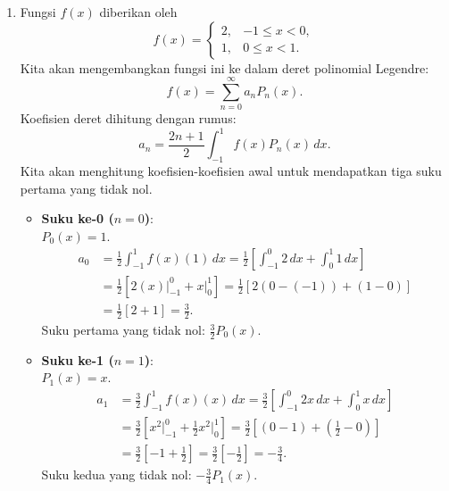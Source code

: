 \documentclass[12pt,openany,a4paper]{article}
\begin{document}
\begin{enumerate}
  \item Fungsi $f(x)$ diberikan oleh
        \[f(x) = \begin{cases} 2, & -1 \le x < 0, \\ 1, & 0 \le x < 1. \end{cases}\]
        Kita akan mengembangkan fungsi ini ke dalam deret polinomial Legendre:
        \[f(x) = \sum_{n=0}^{\infty} a_n P_n(x).\]
        Koefisien deret dihitung dengan rumus:
        \[a_n = \frac{2n + 1}{2} \int_{-1}^{1} f(x)P_n(x) \, dx.\]
        Kita akan menghitung koefisien-koefisien awal untuk mendapatkan tiga suku pertama yang tidak nol.
        \begin{itemize}
          \item \textbf{Suku ke-0 ($n=0$)}:\\
                $P_0(x) = 1$.
                \begin{align*}
                  a_0 & = \frac{1}{2} \int_{-1}^{1} f(x)(1) \, dx = \frac{1}{2} \left[ \int_{-1}^{0} 2 \, dx + \int_{0}^{1} 1 \, dx \right] \\
                      & = \frac{1}{2} \left[ 2(x)\Big|_{-1}^0 + x\Big|_0^1 \right] = \frac{1}{2} \left[ 2(0 - (-1)) + (1 - 0) \right]       \\
                      & = \frac{1}{2} [2 + 1] = \frac{3}{2}.
                \end{align*}
                Suku pertama yang tidak nol: $\frac{3}{2}P_0(x)$.

          \item \textbf{Suku ke-1 ($n=1$)}:\\
                $P_1(x) = x$.
                \begin{align*}
                  a_1 & = \frac{3}{2} \int_{-1}^{1} f(x)(x) \, dx = \frac{3}{2} \left[ \int_{-1}^{0} 2x \, dx + \int_{0}^{1} x \, dx \right]                       \\
                      & = \frac{3}{2} \left[ x^2\Big|_{-1}^0 + \frac{1}{2}x^2\Big|_0^1 \right] = \frac{3}{2} \left[ (0 - 1) + \left(\frac{1}{2} - 0\right) \right] \\
                      & = \frac{3}{2} \left[ -1 + \frac{1}{2} \right] = \frac{3}{2} \left[ -\frac{1}{2} \right] = -\frac{3}{4}.
                \end{align*}
                Suku kedua yang tidak nol: $-\frac{3}{4}P_1(x)$.


\end{itemize}
\end{enumerate}
\end{document}
